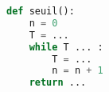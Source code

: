 \begin{center}
\begin{lstlisting}[language=Python]
def seuil():
	n = 0
	T = ...
	while T ... :
		T = ...
		n = n + 1
	return ...
\end{lstlisting}
\end{center}